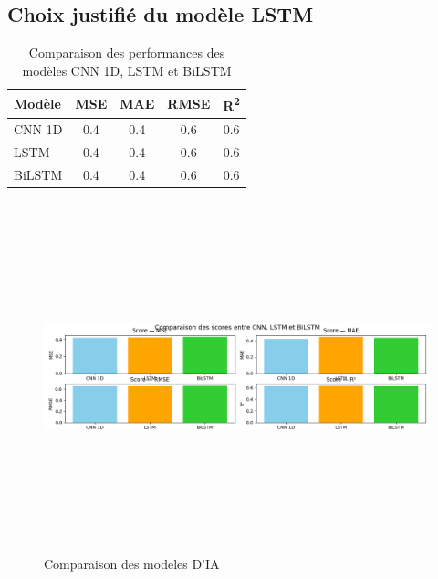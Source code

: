\documentclass[a4paper,12pt,openany]{report}
\begin{document}
	\subsection{Choix justifié du modèle LSTM}
	
	\begin{table}[H]
		\centering
		\caption{Comparaison des performances des modèles CNN 1D, LSTM et BiLSTM}
		\begin{tabular}{|l|c|c|c|c|}
			\toprule
			\textbf{Modèle} & \textbf{MSE} & \textbf{MAE} & \textbf{RMSE} & \textbf{R\textsuperscript{2}} \\
			\midrule
			CNN 1D  & 0.4 & 0.4 & 0.6 & 0.6 \\
			\hline
			LSTM    & 0.4 & 0.4 & 0.6 & 0.6 \\
			\hline
			BiLSTM  & 0.4 & 0.4 & 0.6 & 0.6 \\
			\bottomrule
		\end{tabular}
		\label{tab:comparison_models}
	\end{table}
	\begin{figure}[H]
		\begin{center}
		 \begin{minipage}{\textwidth}
		    \begin{center}
		    \includegraphics[width=1\textwidth,height=4in]{images/3_SCORE.png}
		    \end{center}
		    \end{minipage}

			\caption{Comparaison des modeles D'IA\label{Fig 3.5}}
		\end{center}
	\end{figure}
	
\end{document}
